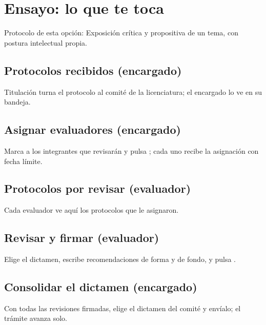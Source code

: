 \section{Ensayo: lo que te toca}
Protocolo de esta opción: Exposición crítica y propositiva de un tema, con postura intelectual propia.
\subsection{Protocolos recibidos (encargado)}
Titulación turna el protocolo al comité de la licenciatura; el encargado lo ve en su bandeja.
\subsection{Asignar evaluadores (encargado)}
Marca a los integrantes que revisarán y pulsa ; cada uno recibe la asignación con fecha límite.
\subsection{Protocolos por revisar (evaluador)}
Cada evaluador ve aquí los protocolos que le asignaron.
\subsection{Revisar y firmar (evaluador)}
Elige el dictamen, escribe recomendaciones de forma y de fondo, y pulsa .
\subsection{Consolidar el dictamen (encargado)}
Con todas las revisiones firmadas, elige el dictamen del comité y envíalo; el trámite avanza solo.
